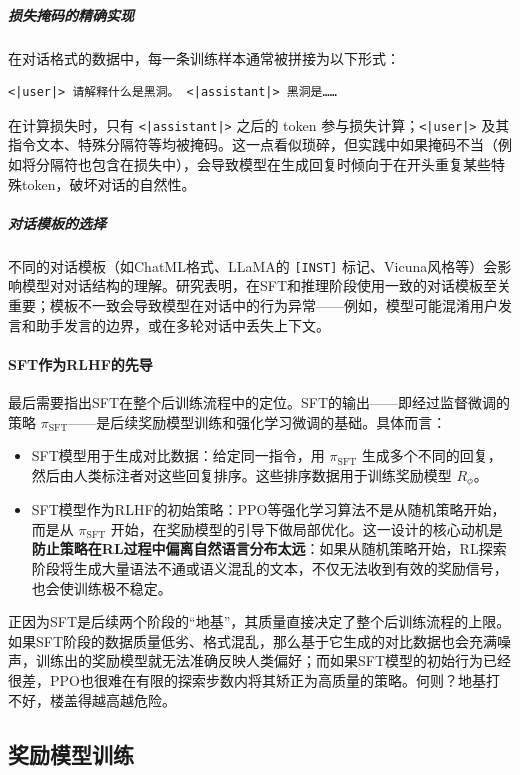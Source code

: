 \subparagraph{损失掩码的精确实现} 在对话格式的数据中，每一条训练样本通常被拼接为以下形式：
\begin{verbatim}
<|user|> 请解释什么是黑洞。 <|assistant|> 黑洞是……
\end{verbatim}
在计算损失时，只有 \texttt{<|assistant|>} 之后的 token 参与损失计算；\texttt{<|user|>} 及其指令文本、特殊分隔符等均被掩码。这一点看似琐碎，但实践中如果掩码不当（例如将分隔符也包含在损失中），会导致模型在生成回复时倾向于在开头重复某些特殊token，破坏对话的自然性。

\subparagraph{对话模板的选择} 不同的对话模板（如ChatML格式、LLaMA的 \texttt{[INST]} 标记、Vicuna风格等）会影响模型对对话结构的理解。研究表明，在SFT和推理阶段使用一致的对话模板至关重要；模板不一致会导致模型在对话中的行为异常——例如，模型可能混淆用户发言和助手发言的边界，或在多轮对话中丢失上下文\cite{touvron2023llamaopenefficientfoundation}。

\paragraph{SFT作为RLHF的先导}

最后需要指出SFT在整个后训练流程中的定位。SFT的输出——即经过监督微调的策略 $\pi_{\text{SFT}}$——是后续奖励模型训练和强化学习微调的基础。具体而言：

\begin{itemize}
    \item SFT模型用于生成对比数据：给定同一指令，用 $\pi_{\text{SFT}}$ 生成多个不同的回复，然后由人类标注者对这些回复排序。这些排序数据用于训练奖励模型 $R_\phi$。
    \item SFT模型作为RLHF的初始策略：PPO等强化学习算法不是从随机策略开始，而是从 $\pi_{\text{SFT}}$ 开始，在奖励模型的引导下做局部优化。这一设计的核心动机是\textbf{防止策略在RL过程中偏离自然语言分布太远}：如果从随机策略开始，RL探索阶段将生成大量语法不通或语义混乱的文本，不仅无法收到有效的奖励信号，也会使训练极不稳定。
\end{itemize}

正因为SFT是后续两个阶段的“地基”，其质量直接决定了整个后训练流程的上限。如果SFT阶段的数据质量低劣、格式混乱，那么基于它生成的对比数据也会充满噪声，训练出的奖励模型就无法准确反映人类偏好；而如果SFT模型的初始行为已经很差，PPO也很难在有限的探索步数内将其矫正为高质量的策略。何则？地基打不好，楼盖得越高越危险。

\subsection{奖励模型训练}

